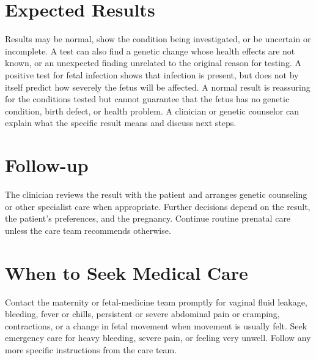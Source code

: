 \section*{Expected Results}
Results may be normal, show the condition being investigated, or be uncertain or incomplete. A test can also find a genetic change whose health effects are not known, or an unexpected finding unrelated to the original reason for testing. A positive test for fetal infection shows that infection is present, but does not by itself predict how severely the fetus will be affected. A normal result is reassuring for the conditions tested but cannot guarantee that the fetus has no genetic condition, birth defect, or health problem. A clinician or genetic counselor can explain what the specific result means and discuss next steps.

\section*{Follow-up}
The clinician reviews the result with the patient and arranges genetic counseling or other specialist care when appropriate. Further decisions depend on the result, the patient's preferences, and the pregnancy. Continue routine prenatal care unless the care team recommends otherwise.

\section*{When to Seek Medical Care}
Contact the maternity or fetal-medicine team promptly for vaginal fluid leakage, bleeding, fever or chills, persistent or severe abdominal pain or cramping, contractions, or a change in fetal movement when movement is usually felt. Seek emergency care for heavy bleeding, severe pain, or feeling very unwell. Follow any more specific instructions from the care team.

